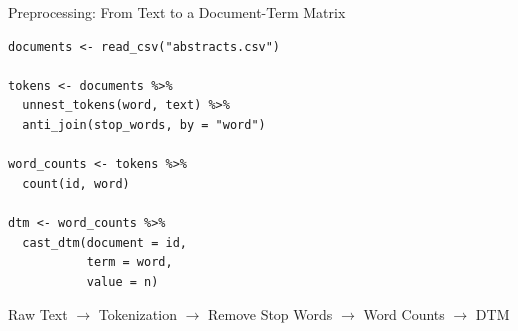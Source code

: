 \documentclass[aspectratio=169]{beamer}
\begin{document}
\begin{frame}[fragile]{Preprocessing: From Text to a Document-Term Matrix}

\small
\begin{lstlisting}[style=Rstyle]
documents <- read_csv("abstracts.csv")

tokens <- documents %>%
  unnest_tokens(word, text) %>%
  anti_join(stop_words, by = "word")

word_counts <- tokens %>%
  count(id, word)

dtm <- word_counts %>%
  cast_dtm(document = id,
           term = word,
           value = n)
\end{lstlisting}

\vspace{0.2cm}

\centering
Raw Text $\rightarrow$ Tokenization $\rightarrow$ Remove Stop Words  $\rightarrow$ Word Counts $\rightarrow$ DTM
\end{frame}
\end{document}
